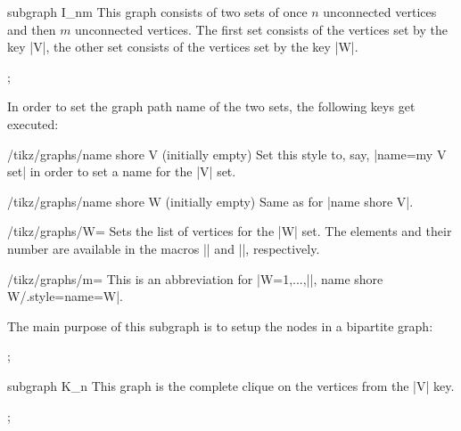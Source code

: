 \begin{graph}{subgraph I\_nm}
    This graph consists of two sets of once $n$ unconnected vertices and then
    $m$ unconnected vertices. The first set consists of the vertices set by the
    key |V|, the other set consists of the vertices set by the key |W|.
\begin{codeexample}[preamble={\usetikzlibrary{graphs.standard}}]
\tikz {};
\end{codeexample}
    In order to set the graph path name of the two sets, the following keys get
    executed:
    \begin{stylekey}{/tikz/graphs/name shore V (initially \normalfont empty)}
        Set this style to, say, |name=my V set| in order to set a name for the
        |V| set.
    \end{stylekey}
    \begin{stylekey}{/tikz/graphs/name shore W (initially \normalfont empty)}
        Same as for |name shore V|.
    \end{stylekey}
    \begin{key}{/tikz/graphs/W=}
        Sets the list of vertices for the |W| set. The elements and their
        number are available in the macros |\tikzgraphW| and |\tikzgraphWnum|,
        respectively.
    \end{key}
    \begin{key}{/tikz/graphs/m=}
        This is an abbreviation for
        |W={1,...,||}, name shore W/.style={name=W}|.
    \end{key}
    The main purpose of this subgraph is to setup the nodes in a bipartite
    graph:
\begin{codeexample}[preamble={\usetikzlibrary{graphs.standard}}]
\tikz {};
\end{codeexample}
\end{graph}

\begin{graph}{subgraph K\_n}
    This graph is the complete clique on the vertices from the |V| key.
\begin{codeexample}[preamble={\usetikzlibrary{graphs.standard}}]
\tikz {};
\end{codeexample}
\end{graph}

